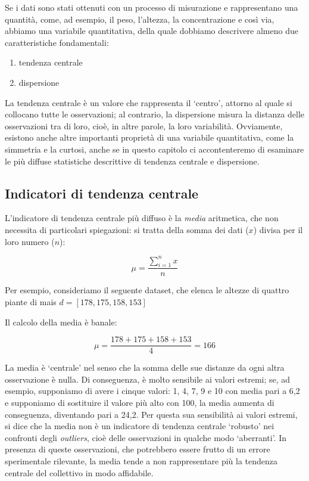 \documentclass[a4paper,12pt,oneside]{book}
\providecommand{\tightlist}{%
  \setlength{\itemsep}{0pt}\setlength{\parskip}{0pt}}
\begin{document}
Se i dati sono stati ottenuti con un processo di misurazione e rappresentano una quantità, come, ad esempio, il peso, l'altezza, la concentrazione e così via, abbiamo una variabile quantitativa, della quale dobbiamo descrivere almeno due caratteristiche fondamentali:

\begin{enumerate}
\def\labelenumi{\arabic{enumi}.}
\tightlist
\item
  tendenza centrale
\item
  dispersione
\end{enumerate}

La tendenza centrale è un valore che rappresenta il `centro', attorno al quale si collocano tutte le osservazioni; al contrario, la dispersione misura la distanza delle osservazioni tra di loro, cioè, in altre parole, la loro variabilità. Ovviamente, esistono anche altre importanti proprietà di una variabile quantitativa, come la simmetria e la curtosi, anche se in questo capitolo ci accontenteremo di esaminare le più diffuse statistiche descrittive di tendenza centrale e dispersione.

\hypertarget{indicatori-di-tendenza-centrale}{%
\subsection{Indicatori di tendenza centrale}\label{indicatori-di-tendenza-centrale}}

L'indicatore di tendenza centrale più diffuso è la \emph{media} aritmetica, che non necessita di particolari spiegazioni: si tratta della somma dei dati (\(x\)) divisa per il loro numero (\(n\)):

\[\mu = \frac{\sum\limits_{i = 1}^n x}{n}\]

Per esempio, consideriamo il seguente dataset, che elenca le altezze di quattro piante di mais \(d = [178, 175, 158, 153]\)

Il calcolo della media è banale:

\[\mu = \frac{178 + 175 + 158 + 153}{4} = 166\]

La media è `centrale' nel senso che la somma delle sue distanze da ogni altra osservazione è nulla. Di conseguenza, è molto sensibile ai valori estremi; se, ad esempio, supponiamo di avere i cinque valori: 1, 4, 7, 9 e 10 con media pari a 6,2 e supponiamo di sostituire il valore più alto con 100, la media aumenta di conseguenza, diventando pari a 24,2. Per questa sua sensibilità ai valori estremi, si dice che la media non è un indicatore di tendenza centrale `robusto' nei confronti degli \emph{outliers}, cioè delle osservazioni in qualche modo `aberranti'. In presenza di queste osservazioni, che potrebbero essere frutto di un errore sperimentale rilevante, la media tende a non rappresentare più la tendenza centrale del collettivo in modo affidabile.
\end{document}
